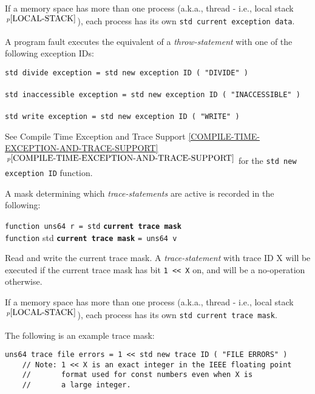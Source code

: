 \documentclass[12pt]{article}
\newcommand{\ttkey}[1]{{\tt \bfseries #1}}
\newcommand{\itemref}[1]{\ref{#1}$\,^{p\pageref{#1}}$}
\newcommand{\pagnote}[1]{$\,^{p\pageref{#1}}$}
\newenvironment{indpar}[1][0.3in]%
	{\begin{list}{}%
		     {\setlength{\itemsep}{0in}%
		      \setlength{\topsep}{0in}%
		      \setlength{\parsep}{1ex}%
		      \setlength{\labelwidth}{#1}%
		      \setlength{\leftmargin}{#1}%
		      \addtolength{\leftmargin}{\labelsep}}%
	 \item}%
	{\end{list}}
\begin{document}
If a memory space has more than one process (a.k.a., thread - i.e., local
stack\pagnote{LOCAL-STACK}), each process has its own
{\tt std current exception data}.

A program fault executes the equivalent of a {\em throw-statement}
with one of the following exception IDs:

{\tt std divide exception = std new exception ID ( "DIVIDE" )} \\
\hspace*{1in}{\tt // Integer divide by zero.} \\
{\tt std inaccessible exception = std new exception ID ( "INACCESSIBLE" )} \\
\hspace*{1in}{\tt // Read or write of inaccessible memory location.}  \\
{\tt std write exception = std new exception ID ( "WRITE" )} \\
\hspace*{1in}{\tt // Write of accessible but write-protected
                  memory location.}

See Compile Time Exception and Trace Support
\itemref{COMPILE-TIME-EXCEPTION-AND-TRACE-SUPPORT}
for the {\tt std new exception ID} function.

A mask determining which {\em trace-statements} are active
is recorded in the following:

{\tt function uns64 r = std} \ttkey{current trace mask}%
\label{CURRENT-TRACE-MASK} \\
{\tt function} std \ttkey{current trace mask} {\tt = uns64 v}
\begin{indpar}
Read and write the current trace mask.
A {\em trace-statement} with trace ID X
will be executed if the current trace mask has bit {\tt 1 <{}< X}
on, and will be a no-operation otherwise.
\end{indpar}

If a memory space has more than one process (a.k.a., thread - i.e., local
stack\pagnote{LOCAL-STACK}), each process has its own
{\tt std current trace mask}.

The following is an example trace mask:
\begin{indpar}\begin{verbatim}
uns64 trace file errors = 1 << std new trace ID ( "FILE ERRORS" )
    // Note: 1 << X is an exact integer in the IEEE floating point
    //       format used for const numbers even when X is
    //       a large integer.
\end{verbatim}\end{indpar}
\end{document}
